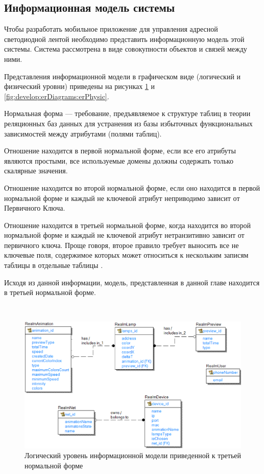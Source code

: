 \subsection{Информационная модель системы}
\label{sec:develop:erDiagrams}

Чтобы разработать мобильное приложение для управления адресной светодиодной лентой необходимо представить информационную модель этой системы. Система рассмотрена в виде совокупности объектов и связей между ними. 

Представления информационной модели в графическом виде (логический и физический уровни) приведены на рисунках \ref{fig:develop:erDiagrams:erLogic} и \ref{fig:develop:erDiagrams:erPhysic}.

Нормальная форма — требование, предъявляемое к структуре таблиц в теории реляционных баз данных для устранения из базы избыточных функциональных зависимостей между атрибутами (полями таблиц).

Отношение находится в первой нормальной форме, если все его атрибуты являются простыми, все используемые домены должны содержать только скалярные значения.

Отношение находится во второй нормальной форме, если оно находится в первой нормальной форме и каждый не ключевой атрибут неприводимо зависит от Первичного Ключа.

Отношение находится в третьей нормальной форме, когда находится во второй нормальной форме и каждый не ключевой атрибут нетранзитивно зависит от первичного ключа. Проще говоря, второе правило требует выносить все не ключевые поля, содержимое которых может относиться к нескольким записям таблицы в отдельные таблицы \cite{er_info}.

Исходя из данной информации, модель, представленная в данной главе находится в третьей нормальной форме.

~
\begin{figure}[H]
\centering
	\includegraphics[scale=0.6]{figures/diagrams/er_diagram_logic.png}
	\caption{Логический уровень информационной модели приведенной к третьей нормальной форме}
	\label{fig:develop:erDiagrams:erLogic}
\end{figure}

